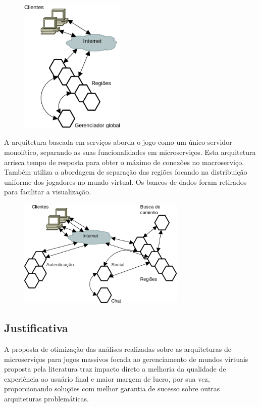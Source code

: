 \begin{figure}[H]
  \includegraphics[width=5cm]{arquiteturas/regioes.png}
  \centering
\end{figure}

A arquitetura baseada em serviços\cite{stephenclarkewillson2017} aborda o jogo como um único servidor monolítico, separando as suas funcionalidades em microserviços. Esta arquitetura arrisca tempo de resposta para obter o máximo de conexões no macroserviço. Também utiliza a abordagem de separação das regiões focando na distribuição uniforme dos jogadores no mundo virtual. Os bancos de dados foram retirados para facilitar a visualização.

\begin{figure}[H]
  \includegraphics[width=8cm]{arquiteturas/servicos.png}
  \centering
\end{figure}

\subsection{Justificativa}

A proposta de otimização das análises realizadas sobre as arquiteturas de microserviços para jogos massivos focada ao gerenciamento de mundos virtuais proposta pela literatura traz impacto direto a melhoria da qualidade de experiência ao usuário final e maior margem de lucro\cite{1417630}, por sua vez, proporcionando soluções com melhor garantia de sucesso sobre outras arquiteturas problemáticas.
